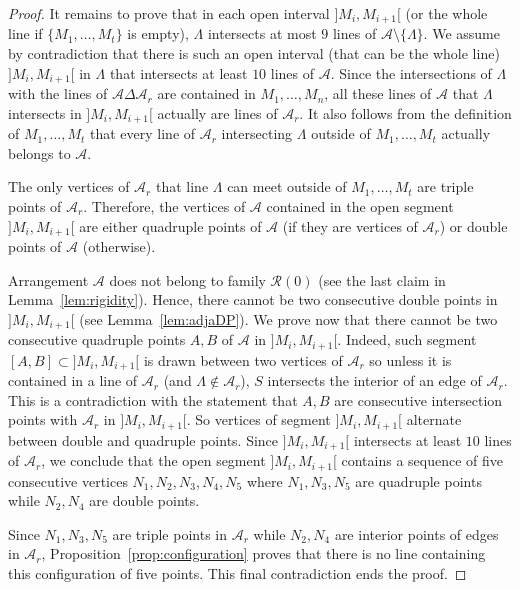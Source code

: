 \documentclass[10pt,a4paper]{amsart}
\begin{document}
\begin{proof}
It remains to prove that in each open interval $]M_{i},M_{i+1}[$ (or the whole line if $\lbrace{ M_{1},\dots,M_{t} \rbrace}$ is empty), $\Lambda$ intersects at most $9$ lines of $\mathcal{A} \setminus \lbrace{ \Lambda \rbrace}$. We assume by contradiction that there is such an open interval (that can be the whole line) $]M_{i},M_{i+1}[$ in $\Lambda$ that intersects at least $10$ lines of $\mathcal{A}$. Since the intersections of $\Lambda$ with the lines of $\mathcal{A} \Delta \mathcal{A}_{r}$ are contained in $M_{1},\dots,M_{n}$, all these lines of $\mathcal{A}$ that $\Lambda$ intersects in $]M_{i},M_{i+1}[$ actually are lines of  $\mathcal{A}_{r}$. It also follows from the definition of $M_{1},\dots,M_{t}$ that every line of $\mathcal{A}_{r}$ intersecting $\Lambda$ outside of $M_{1},\dots,M_{t}$ actually belongs to $\mathcal{A}$.
\par
The only vertices of $\mathcal{A}_{r}$ that line $\Lambda$ can meet outside of $M_{1},\dots,M_{t}$ are triple points of $\mathcal{A}_{r}$. Therefore, the vertices of $\mathcal{A}$ contained in the open segment $]M_{i},M_{i+1}[$ are either quadruple points of $\mathcal{A}$ (if they are vertices of $\mathcal{A}_{r}$) or double points of $\mathcal{A}$ (otherwise).
\par
Arrangement $\mathcal{A}$ does not belong to family $\mathcal{R}(0)$ (see the last claim in Lemma~\ref{lem:rigidity}). Hence, there cannot be two consecutive double points in $]M_{i},M_{i+1}[$ (see Lemma~\ref{lem:adjaDP}). We prove now that there cannot be two consecutive quadruple points $A,B$ of $\mathcal{A}$ in $]M_{i},M_{i+1}[$. Indeed, such segment $[A,B] \subset ]M_{i},M_{i+1}[$ is drawn between two vertices of $\mathcal{A}_{r}$ so unless it is contained in a line of $\mathcal{A}_{r}$ (and $\Lambda \notin \mathcal{A}_{r}$), $S$ intersects the interior of an edge of $\mathcal{A}_{r}$. This is a contradiction with the statement that $A,B$ are consecutive intersection points with $\mathcal{A}_{r}$ in $]M_{i},M_{i+1}[$. So vertices of segment $]M_{i},M_{i+1}[$ alternate between double and quadruple points. Since $]M_{i},M_{i+1}[$ intersects at least $10$ lines of $\mathcal{A}_{r}$, we conclude that the open segment $]M_{i},M_{i+1}[$ contains a sequence of five consecutive vertices $N_{1},N_{2},N_{3},N_{4},N_{5}$ where $N_{1},N_{3},N_{5}$ are quadruple points while $N_{2},N_{4}$ are double points.
\par
Since $N_{1},N_{3},N_{5}$ are triple points in $\mathcal{A}_{r}$ while $N_{2},N_{4}$ are interior points of edges in $\mathcal{A}_{r}$, Proposition~\ref{prop:configuration} proves that there is no line containing this configuration of five points. This final contradiction ends the proof.
\end{proof}
\end{document}
